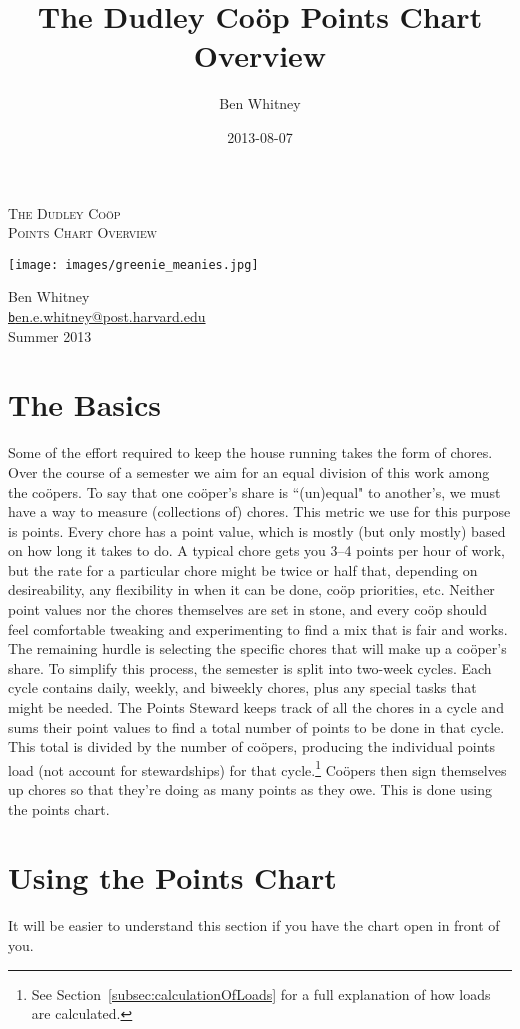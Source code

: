 \documentclass{article}
\title{The Dudley Co\"{o}p Points Chart Overview}
\author{Ben Whitney}
\date{2013-08-07}
\begin{document}
\thispagestyle{empty}
\begin{center}
{
\LARGE
\scshape
The Dudley Co\"{o}p\\
Points Chart Overview
}

\texttt{[image: images/greenie\_meanies.jpg]}

{
\Large
Ben Whitney\\
\href{mailto:ben.e.whitney@post.harvard.edu}{\texttt ben.e.whitney@post.harvard.edu}\\
Summer 2013
}
\end{center}
\newpage

\tableofcontents

\section{The Basics}
Some of the effort required to keep the house running takes the form of chores.
Over the course of a semester we aim for an equal division of this work among the co\"{o}pers.
To say that one co\"{o}per's share is ``(un)equal" to another's, we must have a way to measure (collections of) chores.
This metric we use for this purpose is points.
Every chore has a point value, which is mostly (but only mostly) based on how long it takes to do.
A typical chore gets you 3--4 points per hour of work, but the rate for a particular chore might be twice or half that, depending on desireability, any flexibility in when it can be done, co\"{o}p priorities, etc.
Neither point values nor the chores themselves are set in stone, and every co\"{o}p should feel comfortable tweaking and experimenting to find a mix that is fair and works.
The remaining hurdle is selecting the specific chores that will make up a co\"{o}per's share.
To simplify this process, the semester is split into two-week cycles.
Each cycle contains daily, weekly, and biweekly chores, plus any special tasks that might be needed.
The Points Steward keeps track of all the chores in a cycle and sums their point values to find a total number of points to be done in that cycle.
This total is divided by the number of co\"{o}pers, producing the individual points load (not account for stewardships) for that cycle.\footnote{%
See Section~\ref{subsec:calculationOfLoads} for a full explanation of how loads are calculated.%
}
Co\"{o}pers then sign themselves up chores so that they're doing as many points as they owe.
This is done using the points chart.

\section{Using the Points Chart}
It will be easier to understand this section if you have the chart open in front of you.
\end{document}
